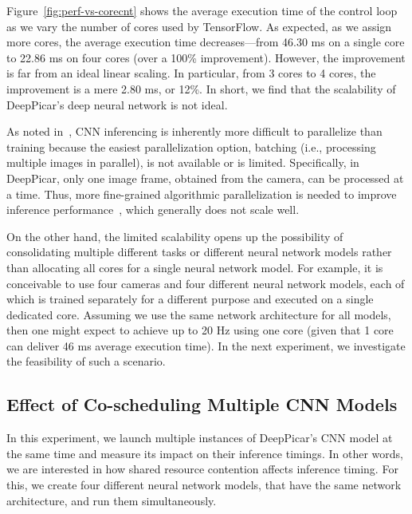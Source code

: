 Figure~\ref{fig:perf-vs-corecnt} shows the average execution time of
the control loop as we vary the number of cores used by
TensorFlow. As expected, as we assign more cores, the average execution
time decreases---from 46.30 ms on a single core to 22.86 ms on four
cores (over a 100\% improvement). However, the improvement is far from an ideal
linear scaling. In particular, from 3 cores to 4 cores, the
improvement is a mere 2.80 ms, or 12\%. In short, we find that the
scalability of DeepPicar's deep neural network is not ideal.

As noted in~\cite{NVIDIA2015}, CNN inferencing is inherently more
difficult to parallelize than training because the easiest
parallelization option, batching (i.e., processing multiple images in
parallel), is not available or is limited. Specifically, in DeepPicar,
only one image frame, obtained from the camera, can be processed at a
time. Thus, more fine-grained algorithmic parallelization is needed to
improve inference performance~\cite{NVIDIA2015}, which generally does
not scale well. 

On the other hand, the limited scalability opens up the possibility of
consolidating multiple different tasks or different neural network
models rather than allocating all cores for a single neural network
model.
For example, it is conceivable to use four cameras and four different
neural network models, each of which is trained separately for a
different purpose and executed on a single dedicated core.
Assuming we use the same network
architecture for all models, then one might expect to achieve up to
20 Hz using one core (given that 1 core can deliver 46 ms average
execution time).
In the next experiment, we investigate the
feasibility of such a scenario.

\subsection{Effect of Co-scheduling Multiple CNN Models}

In this experiment, we launch multiple instances of DeepPicar's CNN
model at the same time and measure its impact on their inference
timings. In other words, we are interested in how shared resource
contention affects inference timing. For this, we create four different
neural network models, that have the same network architecture, and
run them simultaneously.

